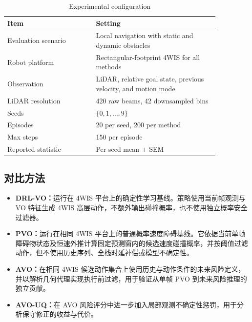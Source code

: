 \documentclass[UTF8,10pt,a4paper,twocolumn]{ctexart}
\begin{document}
\begin{table}[H]
    \centering

    \caption{Experimental configuration}
    \label{tab:exp_config}
    \scriptsize

    \begin{tabular}
{p{0.36\linewidth}p{0.50\linewidth}}
        \toprule

        Item & Setting \\
        \midrule

        Evaluation scenario & Local navigation with static and dynamic obstacles \\
        Robot platform & Rectangular-footprint 4WIS for all methods \\
        Observation & LiDAR, relative goal state, previous velocity, and motion mode \\
        LiDAR resolution & 420 raw beams, 42 downsampled bins \\
        Seeds & $\{0,1,\dots,9\}$ \\
        Episodes & 20 per seed, 200 per method \\
        Max steps & 150 per episode \\
        Reported statistic & Per-seed mean $\pm$ SEM \\
        \bottomrule

    
\end{tabular}
\end{table}

\subsection{对比方法}

\begin{itemize}
    \item \textbf{DRL-VO：}运行在 4WIS 平台上的确定性学习基线。策略使用当前帧观测与 VO 特征生成 4WIS 高层动作，不额外输出碰撞概率，也不使用独立概率安全过滤器。
    \item \textbf{PVO：}运行在相同 4WIS 平台上的普通概率速度障碍基线。它依据当前单帧障碍物状态及恒速外推计算固定预测窗内的候选速度碰撞概率，并按阈值过滤动作，但不使用历史序列、全栈时延补偿或模型不确定性。
    \item \textbf{AVO：}在相同 4WIS 候选动作集合上使用历史与动作条件的未来风险定义，并以解析几何代理实现执行前过滤，用于验证从单帧 PVO 到未来风险推理的独立贡献。
    \item \textbf{AVO-UQ：}在 AVO 风险评分中进一步加入局部观测不确定性惩罚，用于分析保守修正的收益与代价。
\end{itemize}
\end{document}

